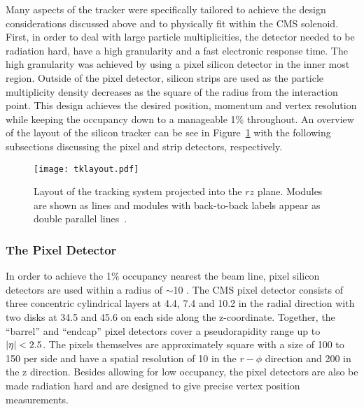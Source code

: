 Many aspects of the tracker were specifically tailored to achieve the design
considerations discussed above and to physically fit within the CMS solenoid.
First, in order to deal with large particle multiplicities, the detector needed
to be radiation hard, have a high granularity and a fast electronic response
time. The high granularity was achieved by using a pixel silicon detector in the
inner most region. Outside of the pixel detector, silicon strips are used as
the particle multiplicity density decreases as the square of the radius from
the interaction point. This design achieves the desired position, momentum
and vertex resolution while keeping the occupancy down to a manageable 1\%
throughout. An overview of the layout of the silicon tracker can be see in
Figure~\ref{fig:cms_tracker} with the following subsections discussing the
pixel and strip detectors, respectively.
\begin{figure}[tbhp]
\begin{center}
\texttt{[image: tklayout.pdf]}
\caption[Layout of the tracking system projected into the $rz$ plane]
{\label{fig:cms_tracker}
Layout of the tracking system projected into the $rz$ plane. Modules are
shown as lines and modules with back-to-back labels appear as double parallel
lines~\cite{trackingperformance}.
}
\end{center}
\end{figure}

\subsubsection{The Pixel Detector}
\label {sec:cms_silicon_pixel}

In order to achieve the 1\% occupancy nearest the beam line, pixel silicon
detectors are used within a radius of $\sim$10 \cm. The CMS pixel detector
consists of three concentric cylindrical layers at 4.4, 7.4 and 10.2 \cm in
the radial direction with two disks at 34.5 and 45.6 \cm on each side along
the z-coordinate. Together, the ``barrel'' and ``endcap'' pixel detectors
cover a pseudorapidity range up to $\left|\eta\right| < 2.5$. The pixels themselves
are approximately square with a size of 100 to 150 \um per side and have a
spatial resolution of 10 \um in the $r - \phi$ direction and 200 \um in the
z direction. Besides allowing for low occupancy, the pixel detectors are
also be made radiation hard and are designed to give precise vertex position
measurements.

